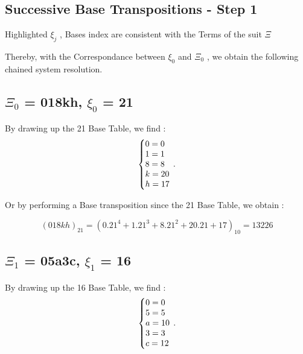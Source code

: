 \documentclass[letterpaper,10pt,english]{sphinxmanual}
\begin{document}
\subsection{Successive Base Transpositions - Step 1}

\begin{flushleft}
  Highlighted $\xi_{j}$ , Bases index are consistent with the Terms of the suit $\Xi$

Thereby, with the Correspondance between $ \xi_{0}$ and $\Xi_{0}$ , we obtain the following chained system resolution.
\end{flushleft}

\subsection{$\Xi_{0}$ = 018kh, $\xi_{0}$ = 21}
By drawing up the 21 Base Table, we find :
\begin{equation}
\centering
\left\{\begin{array}{@{}l@{}}
0=0 \\
1=1 \\
8=8 \\
k=20 \\
h=17 \\
\end{array}\right.\,.
\end{equation}

\begin{flushleft}
  Or by performing a Base transposition since the 21 Base Table, we obtain :
\end{flushleft}
\begin{equation}
(018kh)_{21}=(0.21^{4}+1.21^{3}+8.21^{2}+20.21+17)_{10}=13226
\end{equation}

\subsection{$\Xi_{1}$ = 05a3c, $\xi_{1}$ = 16}
By drawing up the 16 Base Table, we find :
\begin{equation}
\centering
\left\{\begin{array}{@{}l@{}}
0=0 \\
5=5 \\
a=10 \\
3=3 \\
c=12 \\
\end{array}\right.\,.
\end{equation}
\end{document}
